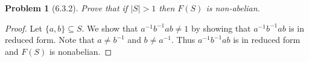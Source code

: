 \documentclass{article}
\newtheorem{problem}{Problem}
\begin{document}
\begin{problem}[6.3.2]
Prove that if $|S| > 1$ then $F(S)$ is non-abelian.
\end{problem}
\begin{proof}
Let $\{a, b\} \subseteq S$. We show that $a^{-1}b^{-1}ab \neq 1$ by showing that $a^{-1}b^{-1}ab$ is in reduced form. Note that $a \neq b^{-1}$ and $b \neq a^{-1}$. Thus $a^{-1}b^{-1}ab$ is in reduced form and $F(S)$ is nonabelian.
\end{proof}
\end{document}
